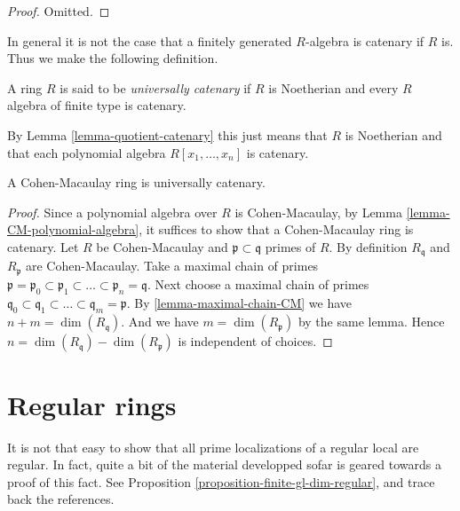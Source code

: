\begin{proof}
Omitted.
\end{proof}

\noindent
In general it is not the case that a finitely generated
$R$-algebra is catenary if $R$ is. Thus we make the following
definition.

\begin{definition}
\label{definition-universally-catenary}
A ring $R$ is said to be {\it universally catenary}
if $R$ is Noetherian and every $R$ algebra of finite
type is catenary.
\end{definition}

\noindent
By Lemma \ref{lemma-quotient-catenary}
this just means that $R$ is Noetherian
and that each polynomial algebra $R[x_1, \ldots, x_n]$
is catenary.

\begin{lemma}
\label{lemma-CM-ring-catenary}
A Cohen-Macaulay ring is universally catenary.
\end{lemma}

\begin{proof}
Since a polynomial algebra over $R$ is Cohen-Macaulay,
by Lemma \ref{lemma-CM-polynomial-algebra},
it suffices to show that a Cohen-Macaulay ring is
catenary.
Let $R$ be Cohen-Macaulay and $\mathfrak p \subset \mathfrak q$
primes of $R$. By definition $R_{\mathfrak q}$ and
$R_{\mathfrak p}$ are Cohen-Macaulay.
Take a maximal chain of primes
$\mathfrak p = \mathfrak p_0 \subset \mathfrak p_1 \subset
\ldots \subset \mathfrak p_n = \mathfrak q$.
Next choose a maximal chain of primes
$\mathfrak q_0 \subset \mathfrak q_1 \subset \ldots \subset
\mathfrak q_m = \mathfrak p$.
By \ref{lemma-maximal-chain-CM} we have
$n + m = \dim(R_{\mathfrak q})$. And we have
$m = \dim(R_{\mathfrak p})$ by the same lemma.
Hence $n = \dim(R_{\mathfrak q}) - \dim(R_{\mathfrak p})$
is independent of choices.
\end{proof}















\section{Regular rings}
\label{section-regular}

\noindent
It is not that easy to show that all prime localizations of a regular local
are regular. In fact, quite a bit of the material developped sofar is
geared towards a proof of this fact. See
Proposition \ref{proposition-finite-gl-dim-regular}, and
trace back the references.

